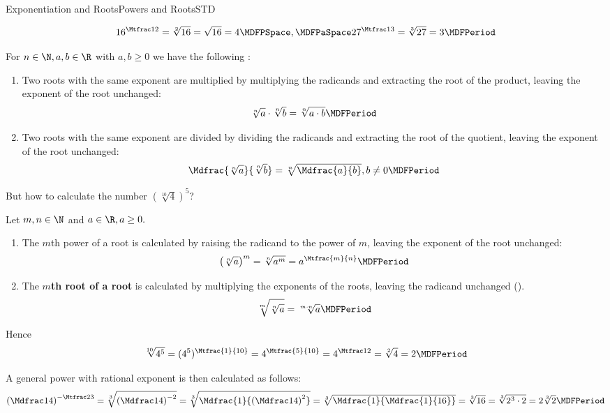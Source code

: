 \begin{MXContent}{Exponentiation and Roots}{Powers and Roots}{STD}
\begin{MExample}
$$16^{\Mtfrac12} = \sqrt[2]{16} = \sqrt{16} = 4\MDFPSpace, \MDFPaSpace 27^{\Mtfrac13} = \sqrt[3]{27} = 3 \MDFPeriod$$
\end{MExample}

\begin{MInfo}
For $n\in\N, a,b\in\R$ with $a,b\geq 0$ we have the following :
\begin{enumerate}
\item Two roots with the same exponent are multiplied by multiplying the radicands and extracting the root of the product, leaving 
the exponent of the root unchanged:
$$\sqrt[n]{a}\cdot \sqrt[n]{b} = \sqrt[n]{a\cdot b} \MDFPeriod$$
\item Two roots with the same exponent are divided by dividing the radicands and extracting the root of the quotient, leaving 
the exponent of the root unchanged:
$$\Mdfrac{\sqrt[n]{a}}{\sqrt[n]{b}} = \sqrt[n]{\Mdfrac{a}{b}}, b\neq 0 \MDFPeriod$$
\end{enumerate}
\end{MInfo}
But how to calculate the number $\displaystyle \left(\sqrt[10]{4}\right)^5$?

\begin{MInfo}
Let $m,n\in\N$ and $a\in\R, a\geq 0.$
\begin{enumerate}
\item The $m$th power of a root is calculated by raising the radicand to the power of $m$, leaving 
the exponent of the root unchanged:
$$\left(\sqrt[n]{a}\right)^m = \sqrt[n]{a^m} = a^{\Mtfrac{m}{n}} \MDFPeriod$$
\item The \textbf{$m$th root of a root} is calculated by multiplying the exponents of the roots, leaving the radicand unchanged
().
$$\sqrt[m]{\sqrt[n]{a}} = \sqrt[m\cdot n]{a} \MDFPeriod$$
\end{enumerate}
\end{MInfo}
Hence
$$\sqrt[10]{4^5} = (4^5)^{\Mtfrac{1}{10}} = 4^{\Mtfrac{5}{10}} = 4^{\Mtfrac12} = \sqrt[2]{4} = 2 \MDFPeriod$$
\newpage

\begin{MExample}
A general power with rational exponent is then calculated as follows:
$$\left(\Mdfrac14\right)^{-\Mtfrac23} = \sqrt[3]{\left(\Mdfrac14\right)^{-2}} = \sqrt[3]{\Mdfrac{1}{\left(\Mdfrac14\right)^2}} = \sqrt[3]{\Mdfrac{1}{\Mdfrac{1}{16}}} = \sqrt[3]{16} = \sqrt[3]{2^3\cdot 2}=2\sqrt[3]{2} \MDFPeriod$$ 
\end{MExample}


\end{MXContent}

